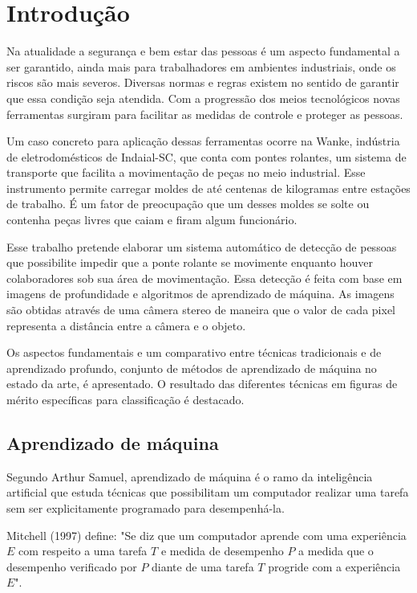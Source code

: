 \chapter{Introdução}

Na atualidade a segurança e bem estar das pessoas é um aspecto fundamental a ser garantido, ainda mais para trabalhadores em ambientes industriais, onde os riscos são mais severos. Diversas normas e regras existem no sentido de garantir que essa condição seja atendida. Com a progressão dos meios tecnológicos novas ferramentas surgiram para facilitar as medidas de controle e proteger as pessoas.

Um caso concreto para aplicação dessas ferramentas ocorre na Wanke, indústria de eletrodomésticos de Indaial-SC, que conta com pontes rolantes, um sistema de transporte que facilita a movimentação de peças no meio industrial. Esse instrumento permite carregar moldes de até centenas de kilogramas entre estações de trabalho. É um fator de preocupação que um desses moldes se solte ou contenha peças livres que caiam e firam algum funcionário. 

Esse trabalho pretende elaborar um sistema automático de detecção de pessoas que possibilite impedir que a ponte rolante se movimente enquanto houver colaboradores sob sua área de movimentação. Essa detecção é feita com base em imagens de profundidade e algoritmos de aprendizado de máquina. As imagens são obtidas através de uma câmera stereo de maneira que o valor de cada pixel representa a distância entre a câmera e o objeto. 

Os aspectos fundamentais e um comparativo entre técnicas tradicionais e de aprendizado profundo, conjunto de métodos de aprendizado de máquina no estado da arte, é apresentado. O resultado das diferentes técnicas em figuras de mérito específicas para classificação é destacado.

\section{Aprendizado de máquina}
Segundo Arthur Samuel, aprendizado de máquina é o ramo da inteligência artificial que estuda técnicas que possibilitam um computador realizar uma tarefa sem ser explicitamente programado para desempenhá-la. 

Mitchell (1997) define: "Se diz que um computador aprende com uma experiência $E$ com respeito a uma tarefa $T$ e medida de desempenho $P$ a medida que o desempenho verificado por $P$ diante de uma tarefa $T$ progride com a experiência $E$". 

